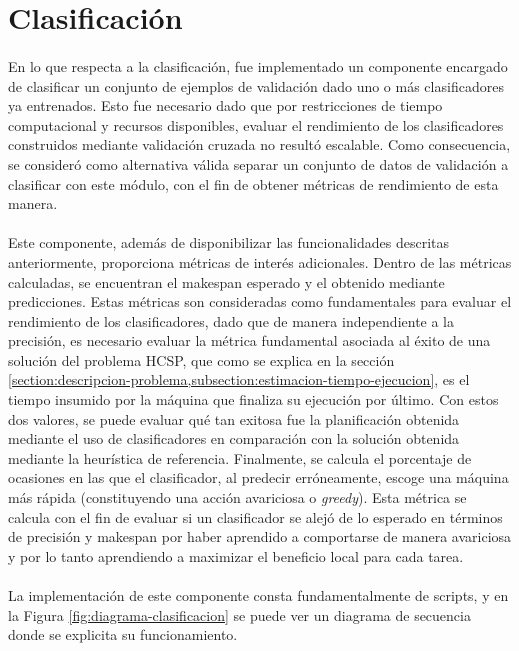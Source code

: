 \section{Clasificación} \label{chapter-implementacion:clasificacion}

\paragraph{} En lo que respecta a la clasificación, fue implementado un componente encargado de clasificar un conjunto de ejemplos de validación dado uno o más clasificadores ya entrenados.
Esto fue necesario dado que por restricciones de tiempo computacional y recursos disponibles, evaluar el rendimiento de los clasificadores construidos mediante validación cruzada no resultó escalable.
Como consecuencia, se consideró como alternativa válida separar un conjunto de datos de validación a clasificar con este módulo, con el fin de obtener métricas de rendimiento de esta manera.

\paragraph{} Este componente, además de disponibilizar las funcionalidades descritas anteriormente, proporciona métricas de interés adicionales.
Dentro de las métricas calculadas, se encuentran el makespan esperado y el obtenido mediante predicciones.
Estas métricas son consideradas como fundamentales para evaluar el rendimiento de los clasificadores, dado que de manera independiente a la precisión, es necesario evaluar la métrica fundamental asociada al éxito de una solución del problema HCSP, que como se explica en la sección \ref{section:descripcion-problema,subsection:estimacion-tiempo-ejecucion}, es el tiempo insumido por la máquina que finaliza su ejecución por último.
Con estos dos valores, se puede evaluar qué tan exitosa fue la planificación obtenida mediante el uso de clasificadores en comparación con la solución obtenida mediante la heurística de referencia.
Finalmente, se calcula el porcentaje de ocasiones en las que el clasificador, al predecir erróneamente, escoge una máquina más rápida (constituyendo una acción avariciosa o \textit{greedy}).
Esta métrica se calcula con el fin de evaluar si un clasificador se alejó de lo esperado en términos de precisión y makespan por haber aprendido a comportarse de manera avariciosa y por lo tanto aprendiendo a maximizar el beneficio local para cada tarea.

\paragraph{} La implementación de este componente consta fundamentalmente de scripts, y en la Figura \ref{fig:diagrama-clasificacion} se puede ver un diagrama de secuencia donde se explicita su funcionamiento.

